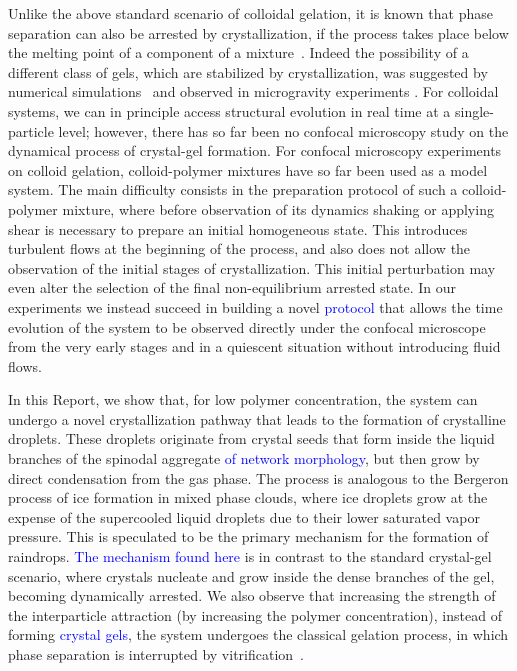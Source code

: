 \documentclass[12pt]{article}
\begin{document}
Unlike the above standard scenario of colloidal gelation, it is known that phase separation can also be arrested by crystallization, if the process takes place below the melting point of a component of a mixture~\cite{tanaka1985new}. Indeed the possibility of a different class of gels, which are stabilized by crystallization, 
was suggested by numerical simulations~\cite{fortini2008crystallization,perez2011pathways} and observed in microgravity experiments \cite{sabin2012}. 
For colloidal systems, we can in principle access structural evolution in real time at a single-particle level; however, there has so far been no confocal microscopy  
study on the dynamical process of crystal-gel formation. 
For confocal microscopy experiments on colloid gelation, colloid-polymer mixtures have so far been used as a model system. 
The main difficulty consists in the preparation protocol of such a colloid-polymer mixture, where before observation of its dynamics shaking or applying shear is necessary to prepare an initial homogeneous state. This introduces turbulent flows at the beginning of the process, and also does not allow the
observation of the initial stages of crystallization. This initial perturbation may even alter the selection of the final non-equilibrium arrested state.  
In our experiments we instead succeed in building a novel \textcolor{blue}{protocol} that allows the time evolution of the system to be observed directly
under the confocal microscope from the very early stages and in a quiescent situation without introducing fluid flows. 

In this Report, we show that, for low polymer concentration, the system can undergo a novel crystallization pathway that leads to the formation
of crystalline droplets. These droplets originate from crystal seeds that form inside the liquid branches of the spinodal aggregate \textcolor{blue}{of network morphology}, but then grow by direct condensation from the gas phase. The process is analogous to the Bergeron process of ice formation in mixed phase clouds, where ice droplets grow at the
expense of the supercooled liquid droplets due to their lower saturated vapor pressure. 
This is speculated to be the primary mechanism for the formation of raindrops. 
\textcolor{blue}{The mechanism found here} is in contrast to the standard crystal-gel scenario, where crystals nucleate and grow inside the dense branches of the gel, becoming dynamically arrested. We also observe that increasing the strength of the interparticle attraction
(by increasing the polymer concentration), instead of forming \textcolor{blue}{crystal gels}, the system undergoes the classical gelation process, in which
phase separation is interrupted by vitrification~\cite{verhaegh1997transient,tanaka1999colloid,Royall2007,lu2008gelation}. 
\end{document}
